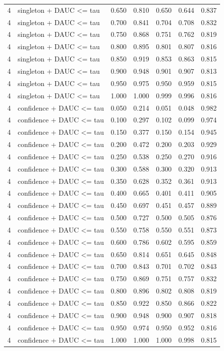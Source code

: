 \begin{tabular}{rlrrrrr}
4 & singleton + DAUC <= tau & 0.650 & 0.810 & 0.650 & 0.644 & 0.837 \\
4 & singleton + DAUC <= tau & 0.700 & 0.841 & 0.704 & 0.708 & 0.832 \\
4 & singleton + DAUC <= tau & 0.750 & 0.868 & 0.751 & 0.762 & 0.819 \\
4 & singleton + DAUC <= tau & 0.800 & 0.895 & 0.801 & 0.807 & 0.816 \\
4 & singleton + DAUC <= tau & 0.850 & 0.919 & 0.853 & 0.863 & 0.815 \\
4 & singleton + DAUC <= tau & 0.900 & 0.948 & 0.901 & 0.907 & 0.813 \\
4 & singleton + DAUC <= tau & 0.950 & 0.975 & 0.950 & 0.959 & 0.815 \\
4 & singleton + DAUC <= tau & 1.000 & 1.000 & 0.999 & 0.996 & 0.816 \\
4 & confidence + DAUC <= tau & 0.050 & 0.214 & 0.051 & 0.048 & 0.982 \\
4 & confidence + DAUC <= tau & 0.100 & 0.297 & 0.102 & 0.099 & 0.974 \\
4 & confidence + DAUC <= tau & 0.150 & 0.377 & 0.150 & 0.154 & 0.945 \\
4 & confidence + DAUC <= tau & 0.200 & 0.472 & 0.200 & 0.203 & 0.929 \\
4 & confidence + DAUC <= tau & 0.250 & 0.538 & 0.250 & 0.270 & 0.916 \\
4 & confidence + DAUC <= tau & 0.300 & 0.588 & 0.300 & 0.320 & 0.913 \\
4 & confidence + DAUC <= tau & 0.350 & 0.628 & 0.352 & 0.361 & 0.913 \\
4 & confidence + DAUC <= tau & 0.400 & 0.665 & 0.401 & 0.411 & 0.905 \\
4 & confidence + DAUC <= tau & 0.450 & 0.697 & 0.451 & 0.457 & 0.889 \\
4 & confidence + DAUC <= tau & 0.500 & 0.727 & 0.500 & 0.505 & 0.876 \\
4 & confidence + DAUC <= tau & 0.550 & 0.758 & 0.550 & 0.551 & 0.873 \\
4 & confidence + DAUC <= tau & 0.600 & 0.786 & 0.602 & 0.595 & 0.859 \\
4 & confidence + DAUC <= tau & 0.650 & 0.814 & 0.651 & 0.645 & 0.848 \\
4 & confidence + DAUC <= tau & 0.700 & 0.843 & 0.701 & 0.702 & 0.843 \\
4 & confidence + DAUC <= tau & 0.750 & 0.869 & 0.751 & 0.757 & 0.832 \\
4 & confidence + DAUC <= tau & 0.800 & 0.896 & 0.802 & 0.808 & 0.819 \\
4 & confidence + DAUC <= tau & 0.850 & 0.922 & 0.850 & 0.866 & 0.822 \\
4 & confidence + DAUC <= tau & 0.900 & 0.948 & 0.900 & 0.907 & 0.818 \\
4 & confidence + DAUC <= tau & 0.950 & 0.974 & 0.950 & 0.952 & 0.816 \\
4 & confidence + DAUC <= tau & 1.000 & 1.000 & 1.000 & 0.998 & 0.815 \\
\bottomrule
\end{tabular}
